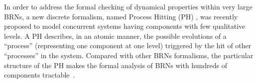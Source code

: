 
In order to address the formal checking of dynamical properties within very large BRNs, a new discrete formalism, named Process Hitting (PH) \cite{PMR10-TCSB}, was recently proposed to model concurrent systems having components with few qualitative levels. A PH describes, in an atomic manner, the possible evolutions of a ``process'' (representing one component at one level) triggered by the hit of other ``processes'' in the system. Compared with other BRNs formalisms, the particular structure of the PH makes the formal analysis of BRNs with hundreds of components tractable~\cite{PMR12-MSCS}. 

